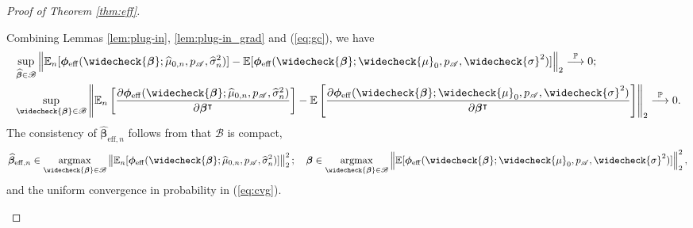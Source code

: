 \documentclass[11pt]{article}
\numberwithin{equation}{section}
\theoremstyle{definition}
\theoremstyle{remark}
\newcommand{\bbeta}{\bm{\beta}}
\newcommand{\bphi}{\bm{\phi}}
\newcommand{\bbE}{\mathbb{E}}
\newcommand{\bbP}{\mathbb{P}}
\newcommand{\sA}{\mathscr{A}}
\newcommand{\sB}{\mathscr{B}}
\newcommand{\argmax}{\mathop{\mathrm{argmax}}}
\newcommand{\eff}{\mathrm{eff}}
\begin{document}
\begin{proof}[Proof of Theorem \ref{thm:eff}]
\begin{enumerate}[label=\textbf{Step \Roman*:},leftmargin=0cm]
		Combining Lemmas \ref{lem:plug-in}, \ref{lem:plug-in_grad} and (\ref{eq:gc}), we have
		\begin{align}
			&\sup_{\widehat{\bbeta} \in \sB}\left\| \bbE_{n}[\bphi_{\eff}(\widecheck{\bbeta};\widehat{\mu}_{0,n},p_{\sA},\widehat{\sigma}_{n}^{2})] - \bbE[\bphi_{\eff}(\widecheck{\bbeta};\widecheck{\mu}_{0},p_{\sA},\widecheck{\sigma}^{2})] \right\|_{2}\stackrel{\bbP}{\longrightarrow} 0; \label{eq:cvg}	\\
			&\sup_{\widecheck{\bbeta} \in \sB} \left\| \bbE_{n}\left[ {\partial \bphi_{\eff}(\widecheck{\bbeta};\widehat{\mu}_{0,n},p_{\sA},\widehat{\sigma}_{n}^{2})\over \partial \bbeta^{\intercal}} \right] - \bbE\left[ {\partial \bphi_{\eff}(\widecheck{\bbeta};\widecheck{\mu}_{0},p_{\sA},\widecheck{\sigma}^{2})\over \partial \bbeta^{\intercal}} \right] \right\|_{2} \stackrel{\bbP}{\longrightarrow} 0. \label{eq:cvg_grad}
		\end{align}
		The consistency of $ \widehat{\bbeta}_{\eff,n} $ follows from that $ \sB $ is compact,
		\[ \widehat{\bbeta}_{\eff,n} \in \argmax_{\widecheck{\bbeta} \in \sB}\left\| \bbE_{n}[\bphi_{\eff}(\widecheck{\bbeta};\widehat{\mu}_{0,n},p_{\sA},\widehat{\sigma}_{n}^{2})] \right\|_{2}^{2}; \quad \bbeta \in \argmax_{\widecheck{\bbeta} \in \sB}\left\| \bbE[\bphi_{\eff}(\widecheck{\bbeta};\widecheck{\mu}_{0},p_{\sA},\widecheck{\sigma}^{2})] \right\|_{2}^{2}, \]
		and the uniform convergence in probability in (\ref{eq:cvg}).
		

\end{enumerate}
\end{proof}
\end{document}
